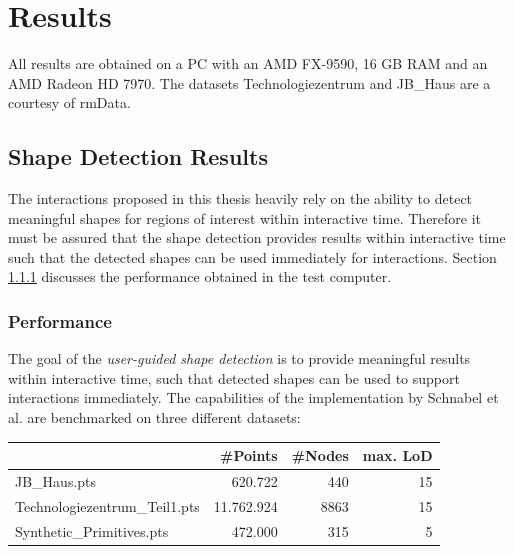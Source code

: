 \chapter{Results}
\label{chap:results}


All results are obtained on a PC with an AMD FX-9590, 16 GB RAM and an AMD Radeon HD 7970. The datasets Technologiezentrum and JB\_Haus are a courtesy of rmData\cite{rmdata}. 


\section{Shape Detection Results}

The interactions proposed in this thesis heavily rely on the ability to detect meaningful shapes for regions of interest within interactive time. Therefore it must be assured that the shape detection provides results within interactive time such that the detected shapes can be used immediately for interactions. Section \ref{sec:shape_detection_performance} discusses the performance obtained in the test computer. 


\subsection{Performance}

\label{sec:shape_detection_performance}

The goal of the \textit{user-guided shape detection} is to provide meaningful results within interactive time, such that detected shapes can be used to support interactions immediately. The capabilities of the implementation by Schnabel et al.\cite{schnabel-2007-software} are benchmarked on three different datasets: 

\begin{center}
\begin{tabular}{ l | r | r | r }
																& \textbf{\#Points} 			& \textbf{\#Nodes} & \textbf{max. LoD} \\
	\hline
  JB\_Haus.pts									& 620.722 								& 440 			& 15 \\
  Technologiezentrum\_Teil1.pts	& 11.762.924							& 8863 			& 15 \\
  Synthetic\_Primitives.pts 		& 472.000 								& 315	 			& 5 \\
	
\end{tabular}
\end{center}

